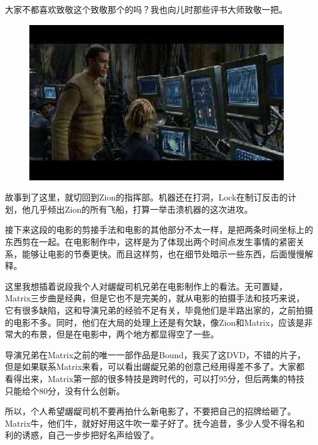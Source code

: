 \documentclass{ctexart}
\begin{document}
大家不都喜欢致敬这个致敬那个的吗？我也向儿时那些评书大师致敬一把。

\begin{figure}[htb]
\centering
\includegraphics[width=0.5\linewidth]{fig/read_reloaded-143}
\end{figure}

故事到了这里，就切回到Zion的指挥部。机器还在打洞，Lock在制订反击的计划，他几乎倾出Zion的所有飞船，打算一举击溃机器的这次进攻。

接下来这段的电影的剪接手法和电影的其他部分不太一样，是把两条时间坐标上的东西剪在一起。在电影制作中，这样是为了体现出两个时间点发生事情的紧密关系，能够让电影的节奏更快。而且这样剪，也在细节处暗示一些东西，后面慢慢解释。

这里我想插着说段我个人对龌龊司机兄弟在电影制作上的看法。无可置疑，Matrix三步曲是经典，但是它也不是完美的，就从电影的拍摄手法和技巧来说，它有很多缺陷，这和导演兄弟的经验不足有关，毕竟他们是半路出家的，之前拍摄的电影不多。同时，他们在大局的处理上还是有欠缺，像Zion和Matrix，应该是非常大的布景，但是在电影中，两个地方都显得空了一些。

导演兄弟在Matrix之前的唯一一部作品是Bound，我买了这DVD，不错的片子，但是如果联系Matrix来看，可以看出龌龊兄弟的创意己经用得差不多了。大家都看得出来，Matrix第一部的很多特技是跨时代的，可以打95分，但后两集的特技只能给个80分，没有什么创新。

所以，个人希望龌龊司机不要再拍什么新电影了，不要把自己的招牌给砸了。Matrix牛，他们牛，就好好用这牛吹一辈子好了。抚今追昔，多少人受不得名和利的诱惑，自己一步步把好名声给毁了。
\end{document}
